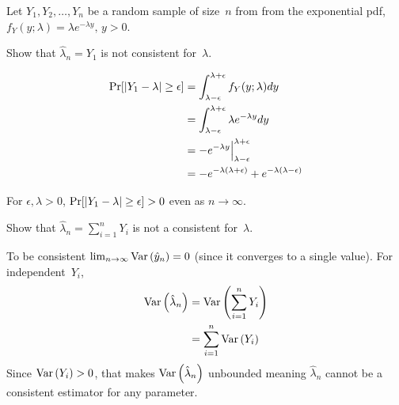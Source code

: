 \begin{problem}
   Let ${Y_1,Y_2,\ldots,Y_n}$ be a random sample of size~$n$ from from the exponential pdf, \linebreak${f_Y(y;\lambda) = \lambda e^{-\lambda y} \text{, } y > 0}$.
\end{problem}

\begin{subproblem}
  Show that ${\hat{\lambda}_n = Y_1}$ is not consistent for~$\lambda$.
\end{subproblem}




\begin{align}
  \Pr\lbrack\lvert Y_1 - \lambda\rvert \geq \epsilon\rbrack &= \int_{\lambda -\epsilon}^{\lambda + \epsilon} f_{Y}(y;\lambda) dy \\
                                                &= \int_{\lambda -\epsilon}^{\lambda + \epsilon} \lambda e^{-\lambda y} dy \\
                                                &= -e^{-\lambda y} \Big\vert_{\lambda -\epsilon}^{\lambda + \epsilon} \\
                                                &= -e^{-\lambda (\lambda + \epsilon)}  + e^{-\lambda (\lambda - \epsilon)}
\end{align}

For ${\epsilon,\lambda >0}$, ${\Pr\lbrack\lvert Y_1 - \lambda\rvert \geq \epsilon\rbrack > 0}$ even as ${n \rightarrow \infty}$.

\begin{subproblem}
  Show that ${\hat{\lambda}_n = \sum_{i=1}^{n} Y_i}$ is not a consistent for~$\lambda$.
\end{subproblem}

To be consistent ${\lim_{n \rightarrow \infty} \text{Var}\left(\hat{y}_n\right) = 0}$ (since it converges to a single value). For independent~$Y_i$,
\begin{align}
  \text{Var}\left(\hat{\lambda}_n\right) &= \text{Var}\left(\sum_{i=1}^{n} Y_i\right) \\
                        &= \sum_{i=1}^{n} \text{Var}\left(Y_i\right)
\end{align}
Since ${\text{Var}\left(Y_i\right)>0}$, that makes $\text{Var}\left(\hat{\lambda}_n\right)$ unbounded meaning $\hat{\lambda}_{n}$ cannot be a consistent estimator for any parameter.
